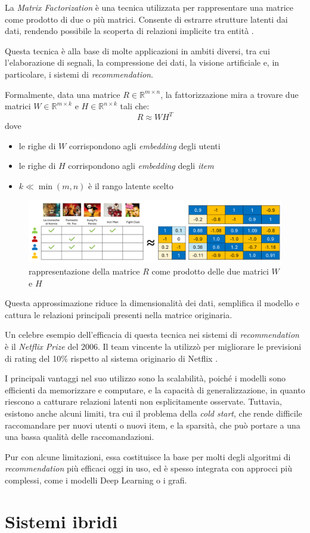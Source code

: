 La \textit{Matrix Factorization} è una tecnica utilizzata per rappresentare una matrice come prodotto di due o più matrici. Consente di estrarre strutture latenti dai dati, rendendo possibile la scoperta di relazioni implicite tra entità \cite{MC}.

Questa tecnica è alla base di molte applicazioni in ambiti diversi, tra cui l'elaborazione di segnali, la compressione dei dati, la visione artificiale e, in particolare, i sistemi di \textit{recommendation}.

Formalmente, data una matrice $R \in \mathbb{R}^{m \times n}$, la fattorizzazione mira a trovare due matrici $W \in \mathbb{R}^{m \times k}$ e $H \in \mathbb{R}^{n \times k}$ tali che:
\[
R \approx WH^T
\]
dove 
\begin{itemize}
    \item le righe di $W$ corrispondono agli \textit{embedding} degli utenti
    \item le righe di $H$ corrispondono agli \textit{embedding} degli \textit{item}
    \item $k \ll \min(m,n)$ è il rango latente scelto
\end{itemize}

\begin{figure}[H]
    \centering
    \includegraphics[scale=0.5]{figures/matrix_factorization.PNG}
    \caption{rappresentazione della matrice $R$ come prodotto delle due matrici $W$ e $H$}
    \label{fig:matrix_factorization}
\end{figure}

Questa approssimazione riduce la dimensionalità dei dati, semplifica il modello e cattura le relazioni principali presenti nella matrice originaria.

Un celebre esempio dell'efficacia di questa tecnica nei sistemi di \textit{recommendation} è il \textit{Netflix Prize} del 2006. Il team vincente la utilizzò per migliorare le previsioni di rating del 10\% rispetto al sistema originario di Netflix \cite{TheNP}.

I principali vantaggi nel suo utilizzo sono la scalabilità, poiché i modelli sono efficienti da memorizzare e computare, e la capacità di generalizzazione, in quanto riescono a catturare relazioni latenti non esplicitamente osservate. Tuttavia, esistono anche alcuni limiti, tra cui il problema della \textit{cold start}, che rende difficile raccomandare per nuovi utenti o nuovi item, e la sparsità, che può portare a una una bassa qualità delle raccomandazioni\cite{SVD_analysis}.

Pur con alcune limitazioni, essa costituisce la base per molti degli algoritmi di \textit{recommendation} più efficaci oggi in uso, ed è spesso integrata con approcci più complessi, come i modelli Deep Learning o i grafi.


\section{Sistemi ibridi}